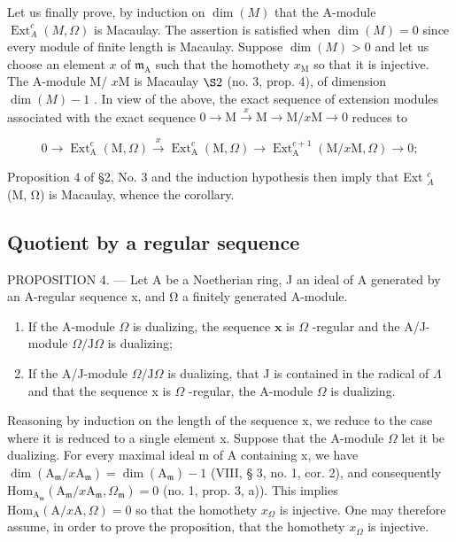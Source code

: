 Let us finally prove, by induction on \(\dim(M)\) that the A-module \(\operatorname{Ext}_{A}^{c}(M,\Omega)\) is Macaulay. The assertion is satisfied when \(\dim(M)=0\) since every module of finite length is Macaulay. Suppose \(\dim(M)>0\) and let us choose an element \(x\) of \(\mathfrak{m}_{\mathrm{A}}\) such that the homothety \(x_{\mathrm{M}}\) so that it is injective. The A-module M/ \(x\mathrm{M}\) is Macaulay \(\S 2\) (no. 3, prop. 4), of dimension \(\dim(M)-1\) . In view of the above, the exact sequence of extension modules associated with the exact sequence \(0\to\mathrm{M}\xrightarrow{x}\mathrm{M}\longrightarrow\mathrm{M}/x\mathrm{M}\to0\) reduces to

\[
0 \to \operatorname{Ext} _ {\mathrm{A}} ^ {c} (\mathrm{M}, \Omega) \xrightarrow {x} \operatorname{Ext} _ {\mathrm{A}} ^ {c} (\mathrm{M}, \Omega) \longrightarrow \operatorname{Ext} _ {\mathrm{A}} ^ {c + 1} (\mathrm{M} / x \mathrm{M}, \Omega) \to 0;
\]

Proposition 4 of §2, No. 3 and the induction hypothesis then imply that Ext \(_{A}^{c}\) (M, Ω) is Macaulay, whence the corollary.

\subsection{Quotient by a regular sequence}

PROPOSITION 4. --- Let A be a Noetherian ring, J an ideal of A generated by an A-regular sequence x, and Ω a finitely generated A-module.

\begin{enumerate}
\def\labelenumi{\alph{enumi})}
\item
  If the A-module \(\Omega\) is dualizing, the sequence \(\mathbf{x}\) is \(\Omega\) -regular and the A/J-module \(\Omega/\mathrm{J}\Omega\) is dualizing;
\item
  If the A/J-module \(\Omega/\mathrm{J}\Omega\) is dualizing, that J is contained in the radical of \(\Lambda\) and that the sequence x is \(\Omega\) -regular, the A-module \(\Omega\) is dualizing.
\end{enumerate}

Reasoning by induction on the length of the sequence x, we reduce to the case where it is reduced to a single element x. Suppose that the A-module \(\Omega\) let it be dualizing. For every maximal ideal m of A containing x, we have \(\dim(\mathrm{A}_{\mathfrak{m}}/x\mathrm{A}_{\mathfrak{m}})=\dim(\mathrm{A}_{\mathfrak{m}})-1\) (VIII, § 3, no. 1, cor. 2), and consequently \(\mathrm{Hom}_{\mathrm{A}_{\mathfrak{m}}}\left(\mathrm{A}_{\mathfrak{m}} / x\mathrm{A}_{\mathfrak{m}}, \Omega_{\mathfrak{m}}\right) = 0\) (no. 1, prop. 3, a)). This implies \(\mathrm{Hom}_{\mathrm{A}}(\mathrm{A} / x\mathrm{A}, \Omega) = 0\) so that the homothety \(x_{\Omega}\) is injective. One may therefore assume, in order to prove the proposition, that the homothety \(x_{\Omega}\) is injective.

